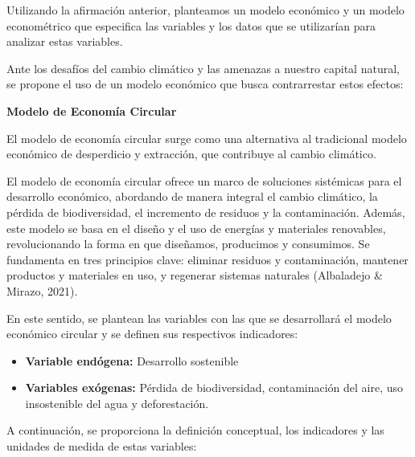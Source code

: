 \documentclass[
  letterpaper,
  DIV=11,
  numbers=noendperiod]{scrartcl}
\providecommand{\tightlist}{%
  \setlength{\itemsep}{0pt}\setlength{\parskip}{0pt}}\usepackage{longtable,booktabs,array}
\begin{document}
Utilizando la afirmación anterior, planteamos un modelo económico y un
modelo econométrico que especifica las variables y los datos que se
utilizarían para analizar estas variables.

Ante los desafíos del cambio climático y las amenazas a nuestro capital
natural, se propone el uso de un modelo económico que busca
contrarrestar estos efectos:

\textbf{Modelo de Economía Circular}

El modelo de economía circular surge como una alternativa al tradicional
modelo económico de desperdicio y extracción, que contribuye al cambio
climático.

El modelo de economía circular ofrece un marco de soluciones sistémicas
para el desarrollo económico, abordando de manera integral el cambio
climático, la pérdida de biodiversidad, el incremento de residuos y la
contaminación. Además, este modelo se basa en el diseño y el uso de
energías y materiales renovables, revolucionando la forma en que
diseñamos, producimos y consumimos. Se fundamenta en tres principios
clave: eliminar residuos y contaminación, mantener productos y
materiales en uso, y regenerar sistemas naturales (Albaladejo \& Mirazo,
2021).

En este sentido, se plantean las variables con las que se desarrollará
el modelo económico circular y se definen sus respectivos indicadores:

\begin{itemize}
\tightlist
\item
  \textbf{Variable endógena:} Desarrollo sostenible
\item
  \textbf{Variables exógenas:} Pérdida de biodiversidad, contaminación
  del aire, uso insostenible del agua y deforestación.
\end{itemize}

A continuación, se proporciona la definición conceptual, los indicadores
y las unidades de medida de estas variables:
\end{document}
